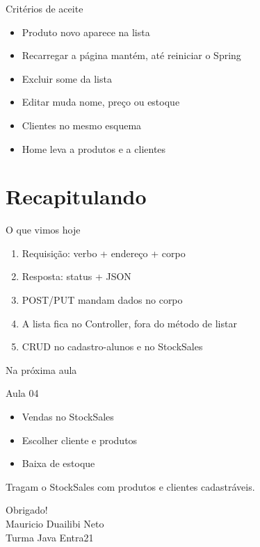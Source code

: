 \documentclass[aspectratio=169,11pt]{beamer}
\begin{document}
\begin{frame}{Critérios de aceite}
  \begin{itemize}
    \item [ ] Produto novo aparece na lista
    \item [ ] Recarregar a página mantém, até reiniciar o Spring
    \item [ ] Excluir some da lista
    \item [ ] Editar muda nome, preço ou estoque
    \item [ ] Clientes no mesmo esquema
    \item [ ] Home leva a produtos e a clientes
  \end{itemize}
\end{frame}

\section{Recapitulando}

\begin{frame}{O que vimos hoje}
  \begin{enumerate}
    \item Requisição: verbo + endereço + corpo
    \item Resposta: status + JSON
    \item POST/PUT mandam dados no corpo
    \item A lista fica no Controller, fora do método de listar
    \item CRUD no cadastro-alunos e no StockSales
  \end{enumerate}
\end{frame}

\begin{frame}{Na próxima aula}
  \begin{block}{Aula 04}
    \begin{itemize}
      \item Vendas no StockSales
      \item Escolher cliente e produtos
      \item Baixa de estoque
    \end{itemize}
  \end{block}

  \vspace{0.6em}
  Tragam o StockSales com produtos e clientes cadastráveis.
\end{frame}

\begin{frame}
  \begin{center}
    \Huge Obrigado!\\[1.2em]
    \normalsize Mauricio Duailibi Neto\\
    Turma Java Entra21
  \end{center}
\end{frame}
\end{document}
